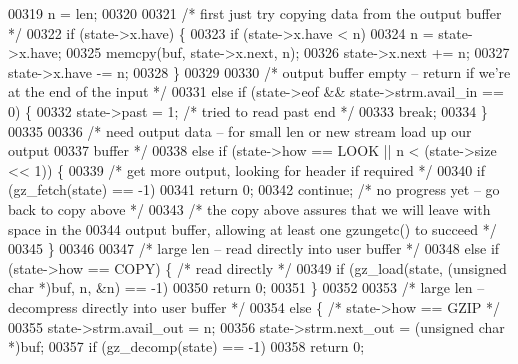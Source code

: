\begin{DoxyCode}
00319             n = len;
00320 
00321         \textcolor{comment}{/* first just try copying data from the output buffer */}
00322         \textcolor{keywordflow}{if} (state->x.have) \{
00323             \textcolor{keywordflow}{if} (state->x.have < n)
00324                 n = state->x.have;
00325             memcpy(buf, state->x.next, n);
00326             state->x.next += n;
00327             state->x.have -= n;
00328         \}
00329 
00330         \textcolor{comment}{/* output buffer empty -- return if we're at the end of the input */}
00331         \textcolor{keywordflow}{else} \textcolor{keywordflow}{if} (state->eof && state->strm.avail\_in == 0) \{
00332             state->past = 1;        \textcolor{comment}{/* tried to read past end */}
00333             \textcolor{keywordflow}{break};
00334         \}
00335 
00336         \textcolor{comment}{/* need output data -- for small len or new stream load up our output}
00337 \textcolor{comment}{           buffer */}
00338         \textcolor{keywordflow}{else} \textcolor{keywordflow}{if} (state->how == LOOK || n < (state->size << 1)) \{
00339             \textcolor{comment}{/* get more output, looking for header if required */}
00340             \textcolor{keywordflow}{if} (gz\_fetch(state) == -1)
00341                 \textcolor{keywordflow}{return} 0;
00342             \textcolor{keywordflow}{continue};       \textcolor{comment}{/* no progress yet -- go back to copy above */}
00343             \textcolor{comment}{/* the copy above assures that we will leave with space in the}
00344 \textcolor{comment}{               output buffer, allowing at least one gzungetc() to succeed */}
00345         \}
00346 
00347         \textcolor{comment}{/* large len -- read directly into user buffer */}
00348         \textcolor{keywordflow}{else} \textcolor{keywordflow}{if} (state->how == COPY) \{      \textcolor{comment}{/* read directly */}
00349             \textcolor{keywordflow}{if} (gz\_load(state, (\textcolor{keywordtype}{unsigned} \textcolor{keywordtype}{char} *)buf, n, &n) == -1)
00350                 \textcolor{keywordflow}{return} 0;
00351         \}
00352 
00353         \textcolor{comment}{/* large len -- decompress directly into user buffer */}
00354         \textcolor{keywordflow}{else} \{  \textcolor{comment}{/* state->how == GZIP */}
00355             state->strm.avail\_out = n;
00356             state->strm.next\_out = (\textcolor{keywordtype}{unsigned} \textcolor{keywordtype}{char} *)buf;
00357             \textcolor{keywordflow}{if} (gz\_decomp(state) == -1)
00358                 \textcolor{keywordflow}{return} 0;

\end{DoxyCode}
